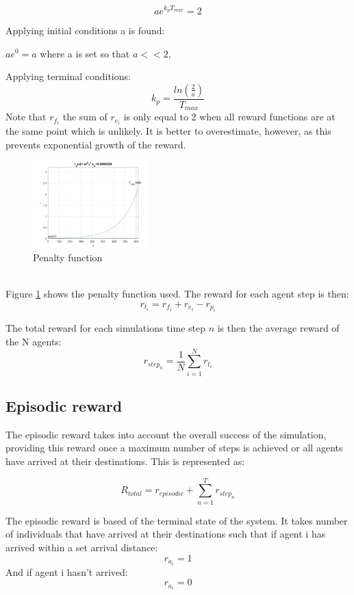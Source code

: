 \[ae^{k_{p} T_{max}} = 2\]

Applying initial conditions a is found:
\begin{center}
    \(ae^0 = a\) where a is set so that \(a << 2,\)
\end{center}


Applying terminal conditions:
\begin{equation}
    k_{p} = \frac{ln(\frac{2}{a})}{T_{max}}
    \label{equ:kp}
\end{equation}
Note that $r_{f_i}$ the sum of $r_{e_i}$ is only equal to 2 when all reward functions are at the same point which is unlikely. It is better to overestimate, however, as this prevents exponential growth of the reward.
\begin{figure}[h]
    \centering
    \includegraphics[width=0.4\textwidth]{figures/Exp3.jpg}
    \caption{Penalty function}
    \label{fig:exp3}
\end{figure}\\
Figure \ref{fig:exp3} shows the penalty function used. The reward for each agent step is then:
\[r_{t_i} = r_{f_i} + r_{e_i} - r_{p_i}\]

The total reward for each simulations time step $n$ is then the average reward of the N agents:
\[r_{step_n} = \frac{1}{N}\sum_{i=1}^{N}r_{t_i}\]


\subsection{Episodic reward}

The episodic reward takes into account the overall success of the simulation, providing this reward once a maximum number of steps is achieved or all agents have arrived at their destinations. This is represented as:

\[R_{total} = r_{episodic} + \sum^T_{n=1}{r_{step_n}}\]

The episodic reward is based of the terminal state of the system.
It takes number of individuals that have arrived at their destinations such that if agent i has arrived within a set arrival distance:
\[r_{a_i} = 1\]
And if agent i hasn't arrived:
\[r_{a_i} = 0\]

